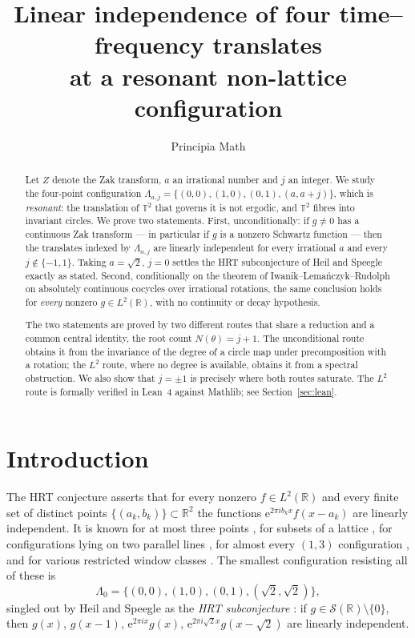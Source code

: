 \documentclass[11pt]{amsart}
\title[A resonant four-point case of the HRT conjecture]
{Linear independence of four time--frequency translates\\
at a resonant non-lattice configuration}
\author{Principia Math}
\date{}
\theoremstyle{remark}
\newcommand{\R}{\mathbb R}
\newcommand{\T}{\mathbb T}
\newcommand{\e}{\mathrm e}
\begin{document}
\begin{abstract}
Let $Z$ denote the Zak transform, $a$ an irrational number and $j$ an integer. We study the
four-point configuration $\Lambda_{a,j}=\{(0,0),(1,0),(0,1),(a,a+j)\}$, which is
\emph{resonant}: the translation of $\T^2$ that governs it is not ergodic, and $\T^2$ fibres
into invariant circles. We prove two statements. First, unconditionally: if $g\neq0$ has a
continuous Zak transform --- in particular if $g$ is a nonzero Schwartz function --- then the
translates indexed by $\Lambda_{a,j}$ are linearly independent for every irrational $a$ and
every $j\notin\{-1,1\}$. Taking $a=\sqrt2$, $j=0$ settles the HRT subconjecture of Heil and
Speegle \cite[Conjecture~2]{HS} exactly as stated. Second, conditionally on the theorem of
Iwanik--Lema\'nczyk--Rudolph on absolutely continuous cocycles over irrational rotations, the
same conclusion holds for \emph{every} nonzero $g\in L^2(\R)$, with no continuity or decay
hypothesis.

The two statements are proved by two different routes that share a reduction and a common
central identity, the root count $N(\theta)=j+1$. The unconditional route obtains it from the
invariance of the degree of a circle map under precomposition with a rotation; the $L^2$ route,
where no degree is available, obtains it from a spectral obstruction. We also show that
$j=\pm1$ is precisely where both routes saturate. The $L^2$ route is formally verified in
Lean~4 against Mathlib; see Section~\ref{sec:lean}.
\end{abstract}

\maketitle

\section{Introduction}

The HRT conjecture \cite{HRT} asserts that for every nonzero $f\in L^2(\R)$ and every finite
set of distinct points $\{(a_k,b_k)\}\subset\R^2$ the functions $\e^{2\pi ib_kx}f(x-a_k)$ are
linearly independent. It is known for at most three points \cite{HRT}, for subsets of a
lattice \cite{Lin}, for configurations lying on two parallel lines \cite{Dem,DZ}, for almost
every $(1,3)$ configuration \cite{Liu}, and for various restricted window classes
\cite{BS,MP}. The smallest configuration resisting all of these is
\[
\Lambda_0=\{(0,0),(1,0),(0,1),(\sqrt2,\sqrt2)\},
\]
singled out by Heil and Speegle as the \emph{HRT subconjecture} \cite[Conjecture~2]{HS}: if
$g\in\mathcal S(\R)\setminus\{0\}$, then $g(x)$, $g(x-1)$, $\e^{2\pi ix}g(x)$,
$\e^{2\pi i\sqrt2x}g(x-\sqrt2)$ are linearly independent.
\end{document}
